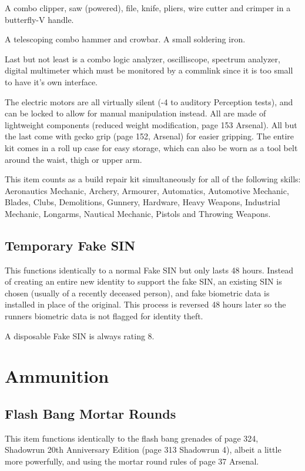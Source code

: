 \documentclass{article}
\begin{document}
  A combo clipper, saw (powered), file, knife, pliers, wire cutter and crimper in a butterfly-V handle.
  
  A telescoping combo hammer and crowbar.  A small soldering iron.  
  
  Last but not least is a combo logic analyzer, oscilliscope, spectrum analyzer, digital multimeter which must be monitored by a commlink since it is too small to have it's own interface.

  The electric motors are all virtually silent (-4 to auditory Perception tests), and can be locked to allow for manual manipulation instead.  All are made of lightweight components (reduced weight modification, page 153 Arsenal).  All but the last come with gecko grip (page 152, Arsenal) for easier gripping.  The entire kit comes in a roll up case for easy storage, which can also be worn as a tool belt around the waist, thigh or upper arm.

  This item counts as a build repair kit simultaneously for all of the following skills:  Aeronautics Mechanic, Archery, Armourer, Automatics, Automotive Mechanic, Blades, Clubs, Demolitions, Gunnery, Hardware, Heavy Weapons, Industrial Mechanic, Longarms, Nautical Mechanic, Pistols and Throwing Weapons.

\subsection*{Temporary Fake SIN}

This functions identically to a normal Fake SIN but only lasts 48 hours.  Instead of creating an entire new identity to support the fake SIN, an existing SIN is chosen (usually of a recently deceased person), and fake biometric data is installed in place of the original.  This process is reversed 48 hours later so the runners biometric data is not flagged for identity theft.

A disposable Fake SIN is always rating 8.

\section*{Ammunition}

\subsection*{Flash Bang Mortar Rounds}

 This item functions identically to the flash bang grenades of page 324, Shadowrun 20th Anniversary Edition (page 313 Shadowrun 4), albeit a little more powerfully, and using the mortar round rules of page 37 Arsenal. 
\end{document}
